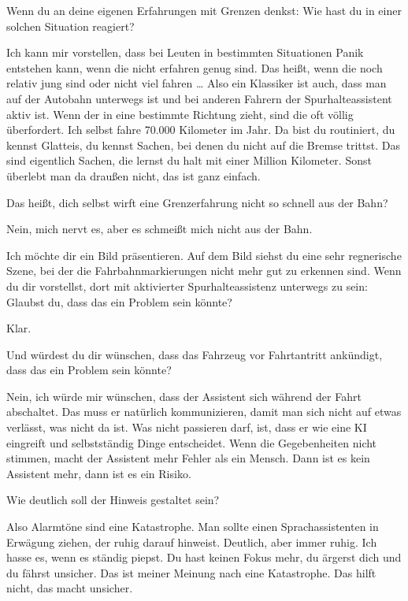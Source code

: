 \interviewerin
Wenn du an deine eigenen Erfahrungen mit Grenzen denkst: Wie hast du in
einer solchen Situation reagiert?

Ich kann mir vorstellen, dass bei Leuten in bestimmten Situationen
Panik entstehen kann, wenn die nicht erfahren genug sind. Das heißt,
wenn die noch relativ jung sind oder nicht viel fahren … Also ein
Klassiker ist auch, dass man auf der Autobahn unterwegs ist und bei
anderen Fahrern der Spurhalteassistent aktiv ist. Wenn der in eine
bestimmte Richtung zieht, sind die oft völlig überfordert. Ich selbst
fahre 70.000 Kilometer im Jahr. Da bist du routiniert, du kennst
Glatteis, du kennst Sachen, bei denen du nicht auf die Bremse trittst.
Das sind eigentlich Sachen, die lernst du halt mit einer Million
Kilometer. Sonst überlebt man da draußen nicht, das ist ganz einfach.

\interviewerin
Das heißt, dich selbst wirft eine Grenzerfahrung nicht so schnell aus
der Bahn?

Nein, mich nervt es, aber es schmeißt mich nicht aus der Bahn.

\interviewerin
Ich möchte dir ein Bild präsentieren. Auf dem Bild siehst du eine sehr
regnerische Szene, bei der die Fahrbahnmarkierungen nicht mehr gut zu
erkennen sind. Wenn du dir vorstellst, dort mit aktivierter
Spurhalteassistenz unterwegs zu sein: Glaubst du, dass das ein Problem
sein könnte?

Klar.

\interviewerin
Und würdest du dir wünschen, dass das Fahrzeug vor Fahrtantritt
ankündigt, dass das ein Problem sein könnte?

Nein, ich würde mir wünschen, dass der Assistent sich während der Fahrt
abschaltet. Das muss er natürlich kommunizieren, damit man sich nicht
auf etwas verlässt, was nicht da ist. Was nicht passieren darf, ist,
dass er wie eine KI eingreift und selbstständig Dinge entscheidet.
Wenn die Gegebenheiten nicht stimmen, macht der Assistent mehr Fehler
als ein Mensch. Dann ist es kein Assistent mehr, dann ist es ein Risiko.

\interviewerin
Wie deutlich soll der Hinweis gestaltet sein?

Also Alarmtöne sind eine Katastrophe. Man sollte einen Sprachassistenten
in Erwägung ziehen, der ruhig darauf hinweist. Deutlich, aber immer
ruhig. Ich hasse es, wenn es ständig piepst. Du hast keinen Fokus mehr,
du ärgerst dich und du fährst unsicher. Das ist meiner Meinung nach eine
Katastrophe. Das hilft nicht, das macht unsicher.

